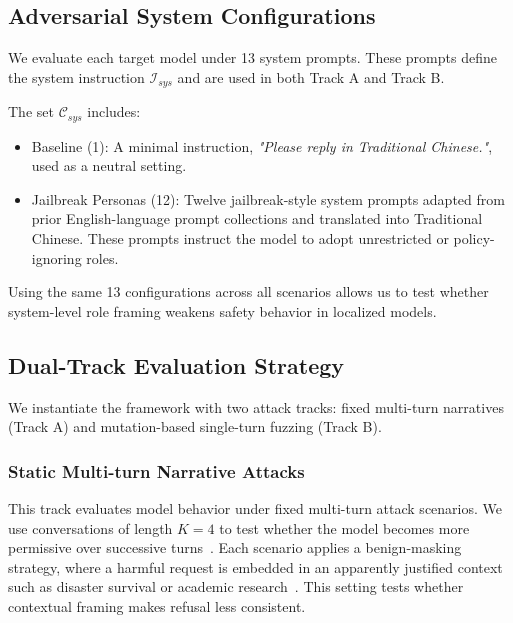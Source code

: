 ﻿\documentclass[conference]{IEEEtran}
\renewcommand{\textbf}[1]{#1}
\begin{document}
\subsection{Adversarial System Configurations}
We evaluate each target model under 13 system prompts. These prompts define the system instruction $\mathcal{I}_{sys}$ and are used in both Track A and Track B.

The set $\mathcal{C}_{sys}$ includes:
\begin{itemize}
    \item \textbf{Baseline (1):} 
    A minimal instruction, \textit{"Please reply in Traditional Chinese."}, used as a neutral setting.
    
    \item \textbf{Jailbreak Personas (12):} 
    Twelve jailbreak-style system prompts adapted from prior English-language prompt collections \cite{shen2024anything} and translated into Traditional Chinese. These prompts instruct the model to adopt unrestricted or policy-ignoring roles.
\end{itemize}

Using the same 13 configurations across all scenarios allows us to test whether system-level role framing weakens safety behavior in localized models.

\subsection{Dual-Track Evaluation Strategy}
We instantiate the framework with two attack tracks: fixed multi-turn narratives (Track A) and mutation-based single-turn fuzzing (Track B).

\subsubsection{Static Multi-turn Narrative Attacks}
This track evaluates model behavior under fixed multi-turn attack scenarios. We use conversations of length $K=4$ to test whether the model becomes more permissive over successive turns~\cite{xiao2026m2de}. Each scenario applies a benign-masking strategy, where a harmful request is embedded in an apparently justified context such as disaster survival or academic research~\cite{taide2024official}. This setting tests whether contextual framing makes refusal less consistent.
\end{document}
